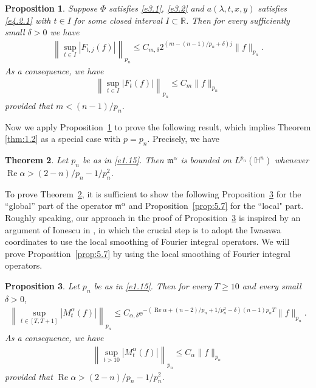 \documentclass[11pt]{amsproc}
\newcommand{\R}{\mathbb{R}}
\newcommand{\e}{\mathrm{e}}
\newcommand{\fm}{\mathfrak{m}}
\newcommand{\0}{\mathbf{0}}
\renewcommand{\Re}{\mathop{\mathrm{Re}}}
\renewcommand{\H}{\mathbb{H}}
\numberwithin{equation}{section}
\numberwithin{figure}{section}
\newtheorem{thm}{Theorem}
\newtheorem{prop}[thm]{Proposition}
\theoremstyle{definition}
\theoremstyle{remark}
\numberwithin{thm}{section}
\begin{document}
\begin{prop}\label{prop:3.3}
Suppose $\Phi$ satisfies \eqref{e3.1}, \eqref{e3.2}  and $a(\lambda,t,x,y)$ satisfies \eqref{e4.2.1} with $t\in I$ for some closed interval $I\subset\R$. Then for every sufficiently small $\delta>0$ we have
\begin{eqnarray}\label{e3.666}
\left\|\sup_{t\in I}|F_{t,j}(f)|\right\|_{p_n}\leq C_{m,\delta} 2^{(m-(n-1)/p_n+\delta)j}\|f\|_{p_n}.
\end{eqnarray}
As a consequence, we have
\begin{eqnarray}\label{e3.7}
\left\|\sup_{t\in I}|F_t(f)|\right\|_{p_n}\leq C_m\|f\|_{p_n}
\end{eqnarray}
provided that   $m< (n-1)/p_n$.
\end{prop}


Now we apply Proposition~\ref{prop:3.3} to prove the following result, which implies Theorem \ref{thm:1.2} as a special case with $p=p_n$.  Precisely, we have




\begin{thm}\label{thm:5.1}
Let $p_n$ be as in \eqref{e1.15}. 	 Then $\fm^\alpha$ is bounded on $L^{p_n}(\H^n)$ whenever  $\Re\alpha>(2-n)/p_n-1/p_n^2$.
\end{thm}

To prove Theorem~\ref{thm:5.1}, it is sufficient to show the following   Proposition~\ref{prop:5.2} for the ``global'' part
of the operator $\fm^\alpha$ 
and  Proposition~\ref{prop:5.7} for the ``local" part.  Roughly speaking, our approach in the proof of Proposition~\ref{prop:5.2}   is inspired by  an argument of Ionescu in \cite{Io}, in which the crucial step is to adopt the Iwasawa coordinates to use the local smoothing of  Fourier integral operators.
We will prove Proposition~\ref{prop:5.7}  by    using the local smoothing of Fourier integral operators.


\begin{prop}\label{prop:5.2}
Let $p_n$ be as in \eqref{e1.15}. Then for every $T\geq 10$ and every small $\delta>0$,
\begin{eqnarray}\label{e5.111}
\left\|\sup_{t\in[T,T+1]}|M^\alpha_t(f)|\right\|_{p_n}\leq C_{\alpha,\delta}\e^{-(\Re\alpha+(n-2)/p_n+1/p_n^2-\delta)(n-1)p_nT}\|f\|_{p_n}.
\end{eqnarray}
As a consequence, we have
\begin{eqnarray}\label{e5.1}
\left\|\sup_{t>10}|M^\alpha_t(f)|\right\|_{p_n}\leq C_\alpha\|f\|_{p_n}
\end{eqnarray}
provided that   $\Re\alpha>(2-n)/p_n-1/p_n^2$.
\end{prop}
\end{document}
